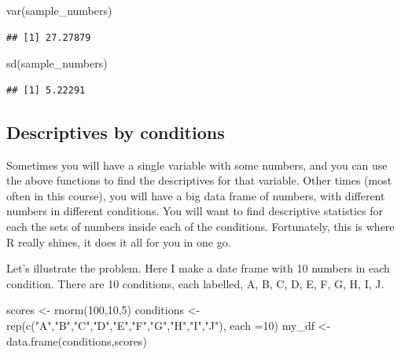\documentclass[
]{book}
\newenvironment{Shaded}{\begin{snugshade}}{\end{snugshade}}
\newcommand{\AttributeTok}[1]{\textcolor[rgb]{0.77,0.63,0.00}{#1}}
\newcommand{\DecValTok}[1]{\textcolor[rgb]{0.00,0.00,0.81}{#1}}
\newcommand{\FunctionTok}[1]{\textcolor[rgb]{0.00,0.00,0.00}{#1}}
\newcommand{\NormalTok}[1]{#1}
\newcommand{\OtherTok}[1]{\textcolor[rgb]{0.56,0.35,0.01}{#1}}
\newcommand{\StringTok}[1]{\textcolor[rgb]{0.31,0.60,0.02}{#1}}
\begin{document}
\begin{Shaded}
\begin{Highlighting}[]
\FunctionTok{var}\NormalTok{(sample\_numbers)}
\end{Highlighting}
\end{Shaded}

\begin{verbatim}
## [1] 27.27879
\end{verbatim}

\begin{Shaded}
\begin{Highlighting}[]
\FunctionTok{sd}\NormalTok{(sample\_numbers)}
\end{Highlighting}
\end{Shaded}

\begin{verbatim}
## [1] 5.22291
\end{verbatim}

\hypertarget{descriptives-by-conditions}{%
\subsection{Descriptives by conditions}\label{descriptives-by-conditions}}

Sometimes you will have a single variable with some numbers, and you can use the above functions to find the descriptives for that variable. Other times (most often in this course), you will have a big data frame of numbers, with different numbers in different conditions. You will want to find descriptive statistics for each the sets of numbers inside each of the conditions. Fortunately, this is where R really shines, it does it all for you in one go.

Let's illustrate the problem. Here I make a date frame with 10 numbers in each condition. There are 10 conditions, each labelled, A, B, C, D, E, F, G, H, I, J.

\begin{Shaded}
\begin{Highlighting}[]
\NormalTok{scores }\OtherTok{\textless{}{-}} \FunctionTok{rnorm}\NormalTok{(}\DecValTok{100}\NormalTok{,}\DecValTok{10}\NormalTok{,}\DecValTok{5}\NormalTok{)}
\NormalTok{conditions }\OtherTok{\textless{}{-}} \FunctionTok{rep}\NormalTok{(}\FunctionTok{c}\NormalTok{(}\StringTok{"A"}\NormalTok{,}\StringTok{"B"}\NormalTok{,}\StringTok{"C"}\NormalTok{,}\StringTok{"D"}\NormalTok{,}\StringTok{"E"}\NormalTok{,}\StringTok{"F"}\NormalTok{,}\StringTok{"G"}\NormalTok{,}\StringTok{"H"}\NormalTok{,}\StringTok{"I"}\NormalTok{,}\StringTok{"J"}\NormalTok{), }\AttributeTok{each =}\DecValTok{10}\NormalTok{)}
\NormalTok{my\_df }\OtherTok{\textless{}{-}} \FunctionTok{data.frame}\NormalTok{(conditions,scores)}
\end{Highlighting}
\end{Shaded}
\end{document}
